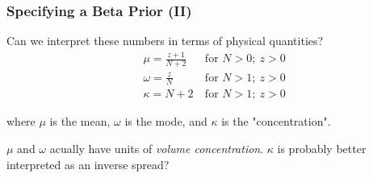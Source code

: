 \documentclass[usenames,dvipsnames,table]{beamer}
\begin{document}
\begin{frame}
\frametitle{Specifying a Beta Prior (II)}
Can we interpret these numbers in terms of physical quantities?
\begin{align*}
&\mu=\frac{z+1}{N+2}& \ \text{for } N>0;\ z>0\\
&\omega=\frac{z}{N}& \ \text{for } N>1;\ z>0\\
&\kappa=N+2 & \ \text{for } N>1;\ z>0
\end{align*}

where $\mu$ is the mean, $\omega$ is the mode, and $\kappa$ is the "concentration".

\vspace{1em}
$\mu$ and $\omega$ acually have units of \emph{volume concentration}. $\kappa$ is probably better interpreted as an inverse spread?

\end{frame}





\end{document}
